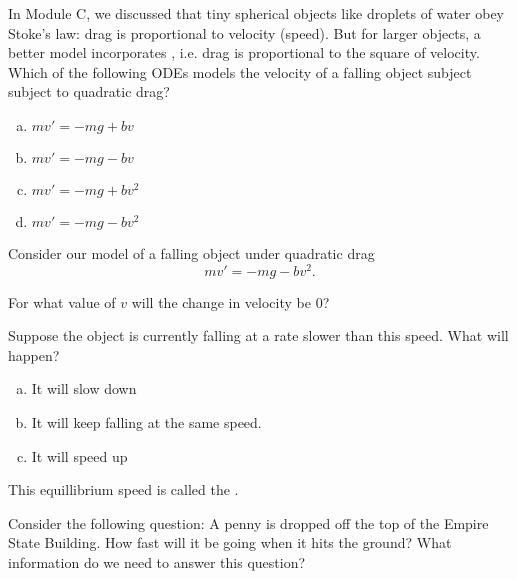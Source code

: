 \begin{applicationActivities}


\begin{activity}{5}
In Module C, we discussed that tiny spherical objects like droplets of water obey Stoke's law: drag is proportional to velocity (speed).  But for larger objects, a better model incorporates , i.e. drag is proportional to the square of velocity.
\vfill
Which of the following ODEs models the velocity of a falling object subject subject to quadratic drag?
\begin{enumerate}[(a)]
\item \(mv'=-mg+bv\)
\item \(mv'=-mg-bv\)
\item \(mv'=-mg+bv^2\)
\item \(mv'=-mg-bv^2\)
\end{enumerate}
\end{activity}

\begin{activity}{10}
Consider our model of a falling object under quadratic drag \[mv'=-mg-bv^2.\]

\begin{subactivity}
For what value of \(v\) will the change in velocity be \(0\)?
\end{subactivity}
\begin{subactivity}
Suppose the object is currently falling at a rate slower than this speed.  What will happen?
\begin{enumerate}[(a)]
\item It will slow down
\item It will keep falling at the same speed.
\item It will speed up
\end{enumerate}
\end{subactivity}
\end{activity}

\begin{observation}
This equillibrium speed is called the .
\end{observation}

\begin{activity}{5}
Consider the following question:
\vfill
A penny is dropped off the top of the Empire State Building.  How fast will it be going when it hits the ground?
\vfill
What information do we need to answer this question?
\end{activity}


\end{applicationActivities}
